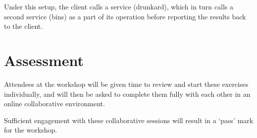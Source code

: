 \documentclass{article}
\begin{document}
Under this setup, the client calls a service (drunkard), which in turn calls a second service (bins) as a part of its operation before reporting the results back to the client.

\section{Assessment}

Attendees at the workshop will be given time to review and start these exercises individually, and will then be asked to complete them fully with each other in an online collaborative environment.

Sufficient engagement with these collaborative sessions will result in a `pass' mark for the workshop.
\end{document}
